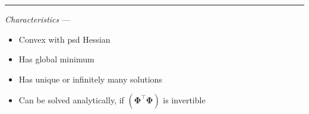 {\color{lightgray}\hrule height 0.001mm}

\emph{Characteristics} --- 
\begin{itemize}
    \item Convex with psd Hessian
    \item Has global minimum
    \item Has unique or infinitely many solutions
    \item Can be solved analytically, if $(\boldsymbol{\Phi}^\intercal \boldsymbol{\Phi})$ is invertible
\end{itemize}